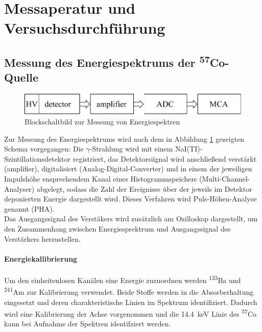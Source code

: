 \documentclass[a4paper,twoside,final]{article}
\begin{document}
\section{Messaperatur und Versuchsdurchführung} \label{sec:Versuchsdurchführung}
\subsection{Messung des Energiespektrums der \textsuperscript{57}Co-Quelle}
\begin{figure}[htp]
    \centering
    \includegraphics{Schaltungen/Blockschaltbild_Energiespektren.pdf}
    \caption{Blockschaltbild zur Messung von Energiespektren}
    \label{fig:BlockEnergiespektren}
\end{figure}

Zur Messung des Energiespektrums wird nach dem in Abbildung \ref{fig:BlockEnergiespektren} gezeigten Schema vorgegangen: Die $\gamma$-Strahlung wird mit einem NaI(TI)-Szintillationsdetektor registriert, das Detektorsiignal wird anschließend verstärkt (amplifier), digitalisiert (Analog-Digital-Converter) und in einem der jeweiligen Impulshöhe ensprechendem Kanal eines Histogrammspeichers (Multi-Channel-Analyser) abgelegt, sodass die Zahl der Ereignisse über der jeweils im Detektor deponierten Energie dargestellt wird. Dieses Verfahren wird Puls-Höhen-Analyse genannt (PHA). \\
Das Ausgangssignal des Verstäkers wird zusätzlich am Ozilloskop dargestellt, um den Zusammenhang zwischen Energiesprektrum und Ausgangssignal des Verstärkers herzustellen. \\
\paragraph{Energiekallibrierung}
Um den einheitenlosen Kanälen eine Energie zuzuordnen werden \textsuperscript{133}Ba und \textsuperscript{241}Am zur Kalibrierung verwendet. Beide Stoffe werden in die Absorberhaltung eingesetzt und deren charakteristische Linien im Spektrum identifiziert. Dadurch wird eine Kalibrierung der Achse vorgenommen und die \SI{14,4}{\kilo\electronvolt} Linie des \textsuperscript{57}Co kann bei Aufnahme der Spektren identifziert werden.
\end{document}
